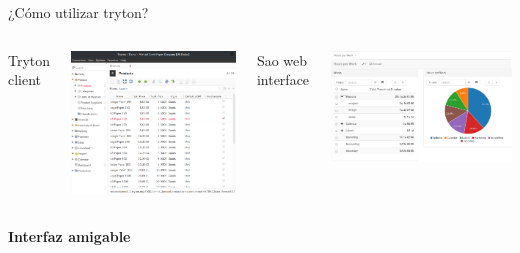     \begin{frame}[fragile=singleslide]{¿Cómo utilizar tryton?}
        \vspace*{-0.3cm}
        \begin{columns}
            \begin{center}
                {\color{ChetwodeBlue}Tryton client}
            \end{center}
            \vspace*{-0.1cm}
            \includegraphics[width=\textwidth]{./Images/demo-products.png}
            \begin{center}
                {\color{ChetwodeBlue}Sao web interface}
            \end{center}
            \includegraphics[width=\textwidth]{./Images/tryton-sao.png}
        \end{columns}

        \begin{center}
            {\color{TurkishRose}\textbf{Interfaz amigable}}
        \end{center}
	\end{frame}


